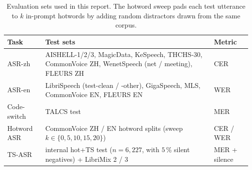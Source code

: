 \begin{table}[t]
  \caption{Evaluation sets used in this report. The hotword sweep
    pads each test utterance to $k$ in-prompt hotwords by adding
    random distractors drawn from the same corpus.}
  \label{tab:eval}
  \centering
  \small
  \begin{tabular}{lp{8.5cm}l}
    \toprule
    Task & Test sets & Metric \\
    \midrule
    ASR-zh        & AISHELL-1/2/3, MagicData, KeSpeech, THCHS-30,
                    CommonVoice ZH, WenetSpeech (net / meeting),
                    FLEURS ZH                                                  & CER \\
    ASR-en        & LibriSpeech (test-clean / -other), GigaSpeech, MLS,
                    CommonVoice EN, FLEURS EN                                  & WER \\
    Code-switch   & TALCS test \cite{li2022talcs}                              & MER \\
    Hotword ASR   & CommonVoice ZH / EN hotword splits (sweep
                    $k\!\in\!\{0, 5, 10, 15, 20\}$)                            & CER / WER \\
    TS-ASR        & internal hot+TS test ($n\!=\!6{,}227$, with $5$\,\%
                    silent negatives) + LibriMix 2 / 3 \cite{cosentino2020librimix}
                                                                              & MER + silence \\
    \bottomrule
  \end{tabular}
\end{table}

